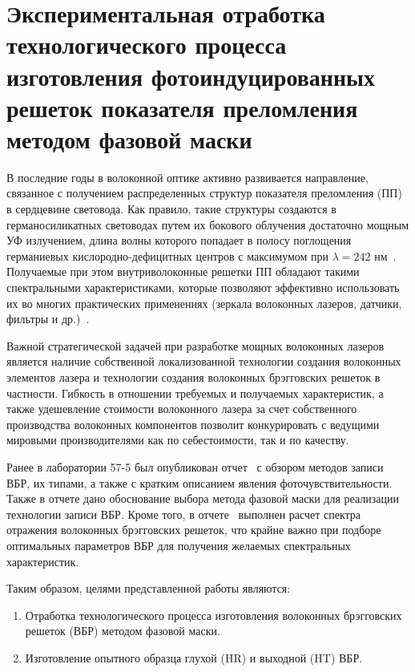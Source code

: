 \section{Экспериментальная отработка технологического процесса изготовления фотоиндуцированных решеток показателя преломления методом фазовой маски}
\label{sec:fbg_exper}

В последние годы в волоконной оптике активно развивается направление, связанное с получением распределенных структур показателя преломления (ПП) в сердцевине световода. Как правило, такие структуры создаются в германосиликатных световодах путем их бокового облучения достаточно мощным УФ излучением, длина волны которого попадает в полосу поглощения германиевых кислородно-дефицитных центров с максимумом при $\lambda = 242$ нм~\cite{fbg_1}. Получаемые при этом внутриволоконные решетки ПП обладают такими спектральными характеристиками, которые позволяют эффективно использовать их во многих практических применениях (зеркала волоконных лазеров, датчики, фильтры и др.)~\cite{fbg_2}.

Важной стратегической задачей при разработке мощных волоконных лазеров является наличие собственной локализованной технологии создания волоконных элементов лазера и технологии создания волоконных брэгговских решеток в частности. Гибкость в отношении требуемых и получаемых характеристик, а также удешевление стоимости волоконного лазера за счет собственного производства волоконных компонентов позволит конкурировать с ведущими мировыми производителями как по себестоимости, так и по качеству.

Ранее в лаборатории 57-5 был опубликован отчет~\cite{fbg_3} с обзором методов записи ВБР, их типами, а также с кратким описанием явления фоточувствительности. Также в отчете дано обоснование выбора метода фазовой маски для реализации технологии записи ВБР. Кроме того, в отчете~\cite{fbg_4} выполнен расчет спектра отражения волоконных брэгговских решеток, что крайне важно при подборе оптимальных параметров ВБР для получения желаемых спектральных характеристик.

Таким образом, целями представленной работы являются:
\begin{enumerate}
    \item Отработка технологического процесса изготовления волоконных брэгговских решеток (ВБР) методом фазовой маски.
    \item Изготовление опытного образца глухой (HR) и выходной (HT) ВБР.
\end{enumerate}

